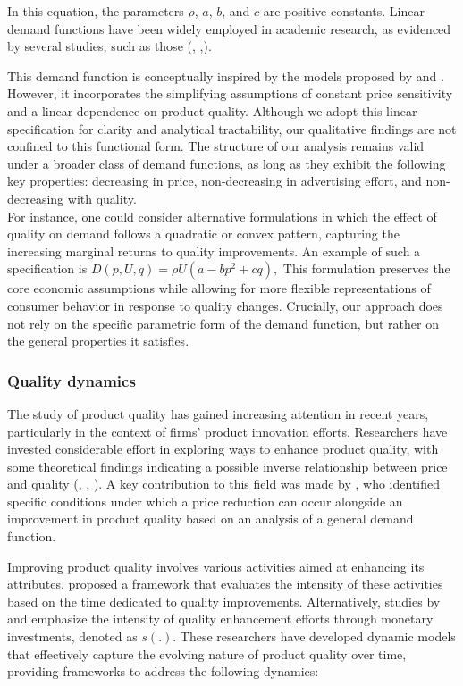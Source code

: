 \documentclass[]{interact}
\theoremstyle{plain}%
\theoremstyle{definition}
\theoremstyle{remark}
\begin{document}
In this equation, the parameters $\rho$, $a$, $b$, and $c$ are positive constants. Linear demand functions have been widely employed in academic research, as evidenced by several studies, such as those (\cite{hsieh2017optimal}, \cite{anton2023dynamic},\cite{zhang2020durable}).


This demand function is conceptually inspired by the models proposed by \cite{sethi2008optimal, anton2023dynamic} and \cite{chenavaz2020modeling}. However, it incorporates the simplifying assumptions of constant price sensitivity and a linear dependence on product quality.
Although we adopt this linear specification for clarity and analytical tractability, our qualitative findings are not confined to this functional form. The structure of our analysis remains valid under a broader class of demand functions, as long as they exhibit the following key properties: decreasing in price, non-decreasing in advertising effort, and non-decreasing with quality.\\
For instance, one could consider alternative formulations in which the effect of quality on demand follows a quadratic or convex pattern, capturing the increasing marginal returns to quality improvements. An example of such a specification is
$
D(p, U, q) = \rho U (a - b p^2 + c q),
$
This formulation preserves the core economic assumptions while allowing for more flexible representations of consumer behavior in response to quality changes. Crucially, our approach does not rely on the specific parametric form of the demand function, but rather on the general properties it satisfies.

\subsubsection{Quality dynamics}

The study of product quality has gained increasing attention in recent years, particularly in the context of firms' product innovation efforts. Researchers have invested considerable effort in exploring ways to enhance product quality, with some theoretical findings indicating a possible inverse relationship between price and quality (\cite{chenavaz2017better}, \cite{voros2019analysis}, \cite{chenavaz2021advertising}). A key contribution to this field was made by \cite{chenavaz2017analytical}, who identified specific conditions under which a price reduction can occur alongside an improvement in product quality based on an analysis of a general demand function.

Improving product quality involves various activities aimed at enhancing its attributes. \cite{chand1996capacity} proposed a framework that evaluates the intensity of these activities based on the time dedicated to quality improvements. Alternatively, studies by \cite{anton2023dynamic} and \cite{ni2019better} emphasize the intensity of quality enhancement efforts through monetary investments, denoted as $s(.)$. These researchers have developed dynamic models that effectively capture the evolving nature of product quality over time, providing frameworks to address the following dynamics:
\end{document}
